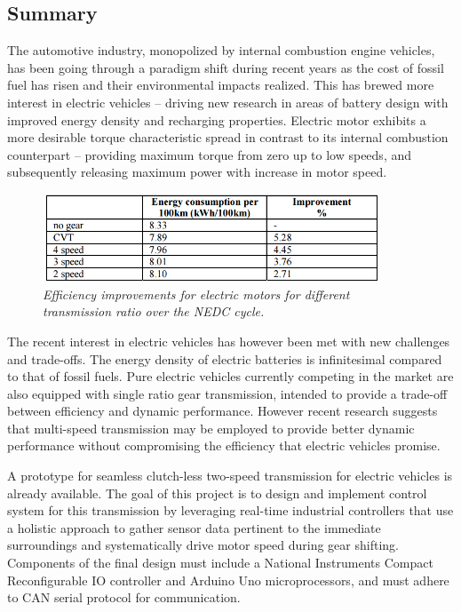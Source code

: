 \documentclass{article}
\begin{document}
\subsection{Summary}
\begin{flushleft}The automotive industry, monopolized by internal combustion engine vehicles, has been going through a paradigm shift during recent years as the cost of fossil fuel has risen and their environmental impacts realized. This has brewed more interest in electric vehicles – driving new research in areas of battery design with improved energy density and recharging properties. Electric motor exhibits a more desirable torque characteristic spread in contrast to its internal combustion counterpart – providing maximum torque from zero up to low speeds, and subsequently releasing maximum power with increase in motor speed.\end{flushleft}

\begin{figure}[!ht]
\centering 
\includegraphics[width=10cm]{fig_1.png}
\caption{\small \sl Efficiency improvements for electric motors for different transmission ratio over the NEDC cycle.}  
\end{figure}

\begin{flushleft}
The recent interest in electric vehicles has however been met with new challenges and trade-offs. The energy density of electric batteries is infinitesimal compared to that of fossil fuels. Pure electric vehicles currently competing in the market are also equipped with single ratio gear transmission, intended to provide a trade-off between efficiency and dynamic performance. However recent research suggests that multi-speed transmission may be employed to provide better dynamic performance without compromising the efficiency that electric vehicles promise.\end{flushleft}

\begin{flushleft}
A prototype for seamless clutch-less two-speed transmission for electric vehicles is already available. The goal of this project is to design and implement control system for this transmission by leveraging real-time industrial controllers that use a holistic approach to gather sensor data pertinent to the immediate surroundings and systematically drive motor speed during gear shifting. Components of the final design must include a National Instruments Compact Reconfigurable IO controller and Arduino Uno microprocessors, and must adhere to CAN serial protocol for communication.\end{flushleft}
\end{document}

